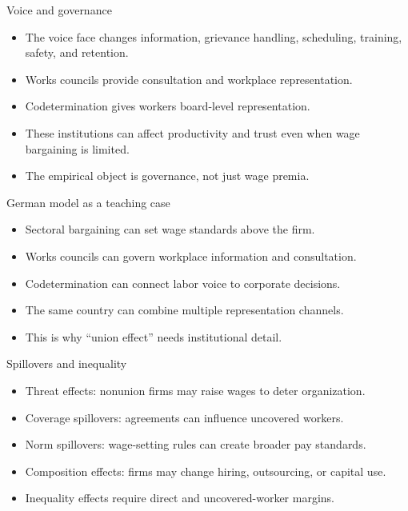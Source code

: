 \documentclass[aspectratio=169,11pt]{beamer}
\begin{document}
\begin{frame}{Voice and governance}
\begin{itemize}
    \item The voice face changes information, grievance handling, scheduling, training, safety, and retention.
    \item Works councils provide consultation and workplace representation.
    \item Codetermination gives workers board-level representation.
    \item These institutions can affect productivity and trust even when wage bargaining is limited.
    \item The empirical object is governance, not just wage premia.
\end{itemize}
\end{frame}

\begin{frame}{German model as a teaching case}
\begin{itemize}
    \item Sectoral bargaining can set wage standards above the firm.
    \item Works councils can govern workplace information and consultation.
    \item Codetermination can connect labor voice to corporate decisions.
    \item The same country can combine multiple representation channels.
    \item This is why ``union effect'' needs institutional detail.
\end{itemize}
\end{frame}

\begin{frame}{Spillovers and inequality}
\begin{itemize}
    \item Threat effects: nonunion firms may raise wages to deter organization.
    \item Coverage spillovers: agreements can influence uncovered workers.
    \item Norm spillovers: wage-setting rules can create broader pay standards.
    \item Composition effects: firms may change hiring, outsourcing, or capital use.
    \item Inequality effects require direct and uncovered-worker margins.
\end{itemize}
\end{frame}
\end{document}
